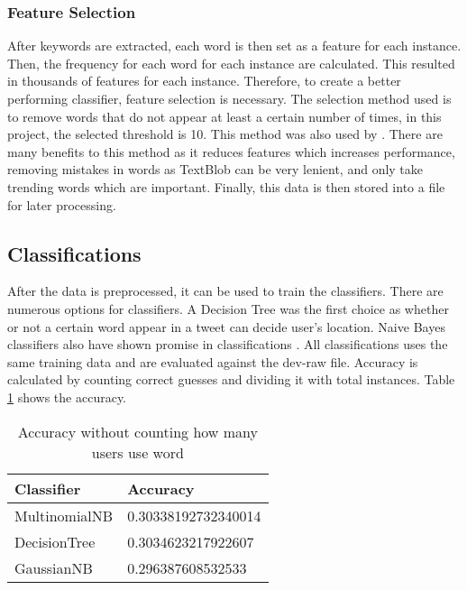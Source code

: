 \documentclass[11pt]{article}
\begin{document}
\subsubsection{Feature Selection}

After keywords are extracted, each word is then set as a feature for each
instance. Then, the frequency for each word for each
instance are calculated. This resulted in thousands of
features for each instance. Therefore, to create a better performing classifier,
feature selection is necessary. The selection method used is to
remove words that do not appear at least a certain number of times, in this
project, the selected threshold is 10. This method was also
used by . There are many benefits to this method as it
reduces features which increases performance, removing mistakes in words as
TextBlob can be very lenient, and only take trending words which are
important. Finally, this data is then stored into a file for later
processing.

\subsection{Classifications}

After the data is preprocessed, it can be used to train the classifiers. There
are numerous options for classifiers. A Decision Tree was the first choice as
whether or not a certain word appear in a tweet can decide user's location.
 Naive Bayes classifiers also have shown promise in classifications
\cite[p. 12]{ARTICLE:1}. All classifications uses the same training
data and are evaluated against the dev-raw file. Accuracy is calculated
by counting correct guesses and dividing it with total instances.
Table \ref{table1} shows the accuracy.

  \begin{table}[h]
    \begin{center}
      \begin{tabular}{|l|l|}

        \hline
        Classifier & Accuracy\\
        \hline
        MultinomialNB & 0.30338192732340014\\
        DecisionTree & 0.3034623217922607\\
        GaussianNB  & 0.296387608532533\\
        \hline
     \end{tabular}
     \caption{Accuracy without counting how many users use word}\label{table1}
   \end{center}
  \end{table}
\end{document}
